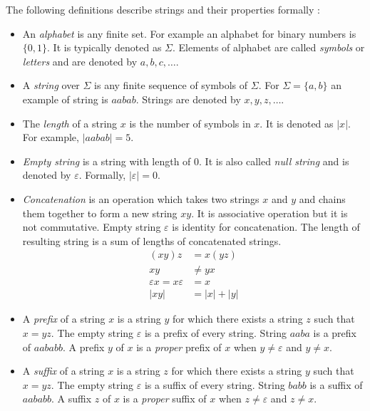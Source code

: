 \documentclass[12pt,final,oneside]{fithesis2}
\theoremstyle{definition}
\begin{document}
The following definitions describe strings and their properties
formally \cite{Kozen97-1}:

\begin{itemize}

\item An \textit{alphabet} is any finite set. For example an alphabet for
binary numbers is $\{0, 1\}$. It is typically denoted as $\Sigma$. Elements
of alphabet are called \textit{symbols} or \textit{letters} and are denoted
by $a, b, c, \dots$.

\item A \textit{string} over $\Sigma$ is any finite sequence of symbols of
$\Sigma$. For $\Sigma = \{a, b\}$ an example of string is $aabab$. Strings
are denoted by $x, y, z, \dots$.

\item The \textit{length} of a string $x$ is the number of symbols in $x$.
It is denoted as $|x|$. For example, $|aabab| = 5$.

\item \textit{Empty string} is a string with length of 0. It is also called
\textit{null string} and is denoted by $\varepsilon$. Formally,
$|\varepsilon| = 0$.

\item \textit{Concatenation} is an operation which takes two strings $x$
and $y$ and chains them together to form a new string $xy$. It is
associative operation but it is not commutative. Empty string $\varepsilon$ is
identity for concatenation. The length of resulting string is a sum of
lengths of concatenated strings.
\begin{align*}
(xy)z &= x(yz) \\
xy &\neq yx \\
\varepsilon x = x \varepsilon &= x \\
|xy| &= |x| + |y|
\end{align*}

\item A \textit{prefix} of a string $x$ is a string $y$ for which there
exists a string $z$ such that $x = yz$. The empty string $\varepsilon$ is
a prefix of every string. String $aaba$ is a prefix of $aababb$. A prefix
$y$ of $x$ is a \textit{proper} prefix of $x$ when $y \neq \varepsilon$ and
$y \neq x$.

\item A \textit{suffix} of a string $x$ is a string $z$ for which there
exists a string $y$ such that $x = yz$. The empty string $\varepsilon$ is
a suffix of every string. String $babb$ is a suffix of $aababb$. A suffix
$z$ of $x$ is a \textit{proper} suffix of $x$ when $z \neq \varepsilon$ and
$z \neq x$.

\end{itemize}
\end{document}
